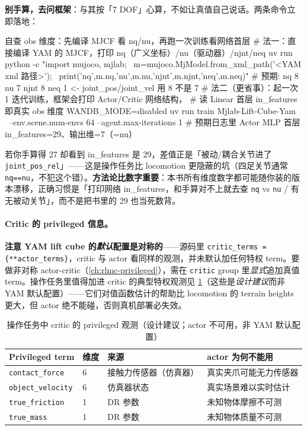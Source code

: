 \textbf{别手算，去问框架}：与其按「7 DOF」心算，不如让真值自己说话。两条命令立即落地：
\begin{codebox}[bash]{自查 obs 维度：先编译 MJCF 看 nq/nu，再跑一次训练看网络首层}
# 法一：直接编译 YAM 的 MJCF，打印 nq（广义坐标）/nu（驱动器）/njnt/neq
uv run python -c "import mujoco, mjlab; \
  m=mujoco.MjModel.from_xml_path('<YAM xml 路径>'); \
  print('nq',m.nq,'nu',m.nu,'njnt',m.njnt,'neq',m.neq)"
#   预期: nq 8 nu 7 njnt 8 neq 1   <- joint_pos/joint_vel 用 8 不是 7
# 法二（更省事）：起一次 1 迭代训练，框架会打印 Actor/Critic 网络结构，
#   读 Linear 首层 in_features 即真实 obs 维度
WANDB_MODE=disabled uv run train Mjlab-Lift-Cube-Yam \
    --env.scene.num-envs 64 --agent.max-iterations 1
#   预期日志里 Actor MLP 首层 in_features=29、输出维=7（=nu）
\end{codebox}
若你手算得 27 却看到 in\_features 是 29，差值正是「被动/耦合关节进了 \verb|joint_pos_rel|」——这是操作任务比 locomotion 更隐蔽的坑（四足关节通常 \verb|nq==nu|，不犯这个错）。\textbf{方法论比数字重要}：本书所有维度数字都可能随你装的版本漂移，正确习惯是「打印网络 in\_features，和手算对不上就去查 \texttt{nq} vs \texttt{nu} / 有无被动关节」，而不是把书里的 29 也当死数背。

\paragraph{Critic 的 privileged 信息。}\textbf{注意 YAM lift cube 的\emph{默认}配置是对称的}——源码里 \verb|critic_terms = {**actor_terms}|，critic 与 actor 看同样的观测，并未默认加任何特权 term。要做非对称 actor-critic（\cref{ch:rlmc-privileged}），需在 \verb|critic| group 里\emph{显式}追加真值 term。操作任务里值得加进 critic 的典型特权观测见 \cref{tab:rlmc-manip-priv}（这些是\emph{设计建议}而非 YAM 默认配置）——它们对值函数估计的帮助比 locomotion 的 terrain heights 更大，但 actor 绝不能碰，否则真机部署必失效。

\begin{table}[ht]
\centering
\small
\caption{操作任务中 critic 的 privileged 观测（设计建议；actor 不可用，非 YAM 默认配置）}
\label{tab:rlmc-manip-priv}
\begin{tabular}{@{}llll@{}}
\toprule
Privileged term & 维度 & 来源 & actor 为何不能用 \\
\midrule
\verb|contact_force| & 6 & 接触力传感器（仿真器） & 真实夹爪可能无力传感器 \\
\verb|object_velocity| & 6 & 仿真器状态 & 真实场景难以实时估计 \\
\verb|true_friction| & 1 & DR 参数 & 未知物体摩擦不可测 \\
\verb|true_mass| & 1 & DR 参数 & 未知物体质量不可测 \\
\bottomrule
\end{tabular}
\end{table}

